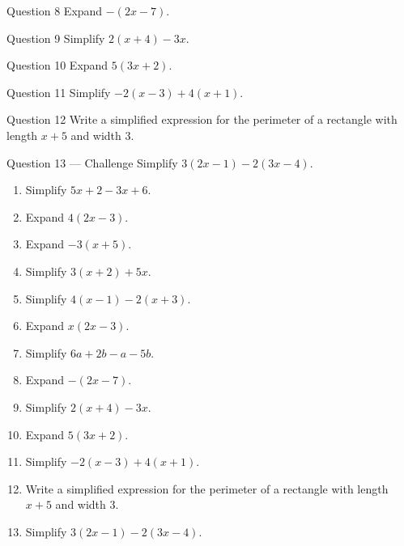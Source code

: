 \documentclass[11pt]{article}
\begin{document}
\begin{qbox}{Question 8}
Expand $-(2x-7)$.\workspace{1.8cm}
\end{qbox}

\begin{qbox}{Question 9}
Simplify $2(x+4)-3x$.\workspace{2.0cm}
\end{qbox}

\begin{qbox}{Question 10}
Expand $5(3x+2)$.\workspace{1.8cm}
\end{qbox}

\begin{qbox}{Question 11}
Simplify $-2(x-3)+4(x+1)$.\workspace{2.2cm}
\end{qbox}

\begin{qbox}{Question 12}
Write a simplified expression for the perimeter of a rectangle with length $x+5$ and width $3$.\workspace{2.2cm}
\end{qbox}

\begin{qbox}{Question 13 --- Challenge}
Simplify $3(2x-1)-2(3x-4)$.\workspace{2.4cm}
\end{qbox}

\clearpage
{}

\begin{recapbox}
\begin{multicols}{2}
\small
\begin{enumerate}[leftmargin=*,itemsep=3pt]
  \item Simplify $5x+2-3x+6$.
  \item Expand $4(2x-3)$.
  \item Expand $-3(x+5)$.
  \item Simplify $3(x+2)+5x$.
  \item Simplify $4(x-1)-2(x+3)$.
  \item Expand $x(2x-3)$.
  \item Simplify $6a+2b-a-5b$.
  \item Expand $-(2x-7)$.
  \item Simplify $2(x+4)-3x$.
  \item Expand $5(3x+2)$.
  \item Simplify $-2(x-3)+4(x+1)$.
  \item Write a simplified expression for the perimeter of a rectangle with length $x+5$ and width $3$.
  \item Simplify $3(2x-1)-2(3x-4)$.
\end{enumerate}
\end{multicols}
\end{recapbox}
\end{document}
